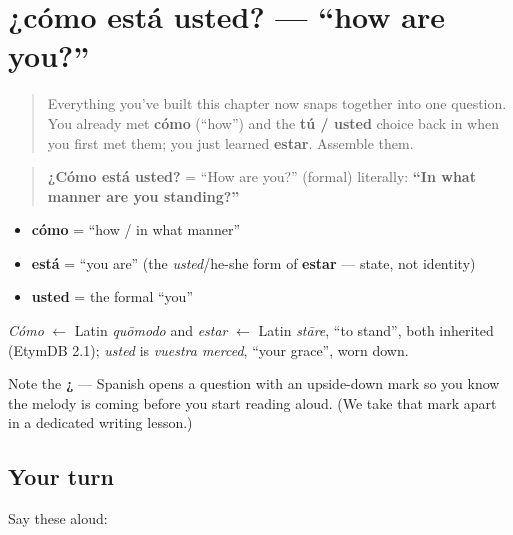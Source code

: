 \section[¿cómo está usted?]{¿cómo está usted? — \textquotedblleft{}how are you?\textquotedblright{}}

\label{lesson:ES-C04-como-esta}



\begin{quote}
Everything you've built this chapter now snaps together into one question. You already met \textbf{cómo} (\textquotedblleft{}how\textquotedblright{}) and the \textbf{tú / usted} choice back in when you first met them; you just learned \textbf{estar}. Assemble them.
\end{quote}

\begin{cousinweb}
\begin{quote}
\textbf{¿Cómo está usted?} = \textquotedblleft{}How are you?\textquotedblright{} (formal) literally: \textbf{\textquotedblleft{}In what manner are you standing?\textquotedblright{}}
\end{quote}

\begin{itemize}
\raggedright
  \item \textbf{cómo} = \textquotedblleft{}how / in what manner\textquotedblright{}
  \item \textbf{está} = \textquotedblleft{}you are\textquotedblright{} (the \emph{usted}/he-she form of \textbf{estar} — state, not identity)
  \item \textbf{usted} = the formal \textquotedblleft{}you\textquotedblright{}
\end{itemize}

\emph{Cómo} $\leftarrow$ Latin \emph{quōmodo} and \emph{estar} $\leftarrow$ Latin \emph{stāre}, \textquotedblleft{}to stand\textquotedblright{}, both inherited (EtymDB 2.1); \emph{usted} is \emph{vuestra merced}, \textquotedblleft{}your grace\textquotedblright{}, worn down.

Note the \textbf{¿} — Spanish opens a question with an upside-down mark so you know the melody is coming before you start reading aloud. (We take that mark apart in a dedicated writing lesson.)
\end{cousinweb}

\subsection*{Your turn}
Say these aloud:

